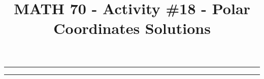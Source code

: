 \documentclass[12pt,oneside,english]{amsart}
\begin{document}
\title{MATH 70 - Activity \#18 - Polar Coordinates Solutions}

\maketitle
\thispagestyle{empty}


\hrule \kern 1mm \hrule

\vspace{1cm}
\end{document}
